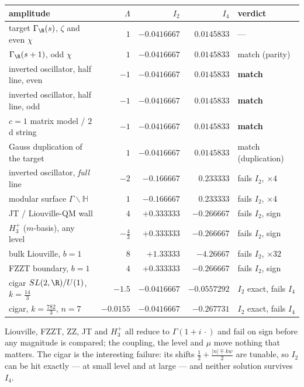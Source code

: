 \begin{center}\small
\begin{tabular}{@{}lrrrl@{}}
\toprule
amplitude & $\Lambda$ & $I_2$ & $I_4$ & verdict\\
\midrule
target $\Gamma_\R(s)$, $\zeta$ and even $\chi$ & $1$ & $-0.0416667$ & $0.0145833$ & ---\\
$\Gamma_\R(s+1)$, odd $\chi$ & $1$ & $-0.0416667$ & $0.0145833$ & match (parity)\\
inverted oscillator, half line, even & $-1$ & $-0.0416667$ & $0.0145833$ & \textbf{match}\\
inverted oscillator, half line, odd & $-1$ & $-0.0416667$ & $0.0145833$ & \textbf{match}\\
$c=1$ matrix model / $2$d string \cite{MoorePlesserRamgoolam} & $-1$ & $-0.0416667$ & $0.0145833$ & \textbf{match}\\
Gauss duplication of the target & $1$ & $-0.0416667$ & $0.0145833$ & match (duplication)\\
inverted oscillator, \emph{full} line & $-2$ & $-0.166667$ & $0.233333$ & fails $I_2$, $\times4$\\
modular surface $\Gamma\backslash\mathbb H$ \cite{Iwaniec} & $1$ & $-0.166667$ & $0.233333$ & fails $I_2$, $\times4$\\
JT / Liouville-QM wall & $4$ & $+0.333333$ & $-0.266667$ & fails $I_2$, sign\\
$H_3^+$ ($m$-basis), any level & $-\frac43$ & $+0.333333$ & $-0.266667$ & fails $I_2$, sign\\
bulk Liouville, $b=1$ & $8$ & $+1.33333$ & $-4.26667$ & fails $I_2$, $\times32$\\
FZZT boundary, $b=1$ & $4$ & $+0.333333$ & $-0.266667$ & fails $I_2$, sign\\
cigar $SL(2,\R)/U(1)$, $k=\frac{14}3$ & $-1.5$ & $-0.0416667$ & $-0.0557292$ & $I_2$ exact, fails $I_4$\\
cigar, $k=\frac{782}3$, $n=7$ & $-0.0155$ & $-0.0416667$ & $-0.267731$ & $I_2$ exact, fails $I_4$\\
\bottomrule
\end{tabular}
\end{center}

Liouville, FZZT, ZZ, JT and $H_3^+$ all reduce to $\Gamma(1+i\,\cdot)$ and fail on
sign before any magnitude is compared; the coupling, the level and $\mu$ move
nothing that matters. The cigar is the interesting failure: its shifts
$\frac12+\frac{|n|\mp kw}2$ are tunable, so $I_2$ can be hit exactly --- at small
level and at large --- and neither solution survives $I_4$.

